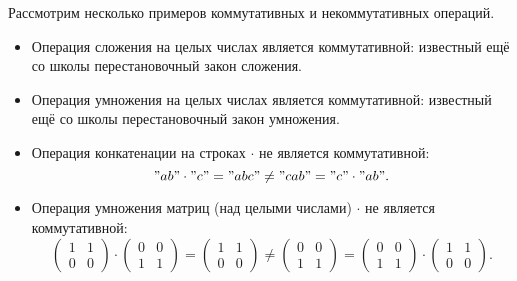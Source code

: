 \begin{example}
    Рассмотрим несколько примеров коммутативных и некоммутативных операций.
    \begin{itemize}
        \item Операция сложения на целых числах является коммутативной: известный ещё со школы перестановочный закон сложения.
        \item Операция умножения на целых числах является коммутативной: известный ещё со школы перестановочный закон умножения.
        \item Операция конкатенации на строках $\cdot$ не является коммутативной:
              \["ab" \cdot "c"  = "abc" \neq "cab" = "c" \cdot "ab".\]
        \item Операция умножения матриц (над целыми числами) $\cdot$ не является коммутативной:
              \[\begin{pmatrix}
                      1 & 1 \\
                      0 & 0
                  \end{pmatrix}
                  \cdot
                  \begin{pmatrix}
                      0 & 0 \\
                      1 & 1
                  \end{pmatrix}
                  =
                  \begin{pmatrix}
                      1 & 1 \\
                      0 & 0
                  \end{pmatrix}
                  \neq
                  \begin{pmatrix}
                      0 & 0 \\
                      1 & 1
                  \end{pmatrix}
                  =
                  \begin{pmatrix}
                      0 & 0 \\
                      1 & 1
                  \end{pmatrix}
                  \cdot
                  \begin{pmatrix}
                      1 & 1 \\
                      0 & 0
                  \end{pmatrix}
                  .\]
    \end{itemize}
\end{example}

